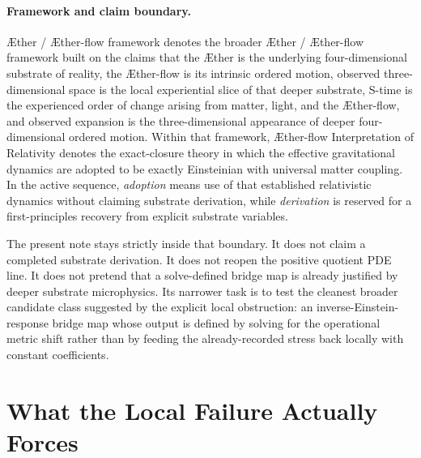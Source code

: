 \documentclass[11pt]{article}
\newcommand{\Aether}{\AE{}ther}
\newcommand{\Aflow}{\AE{}ther-flow}
\newcommand{\TheoryName}{\Aflow{} Interpretation of Relativity}
\newcommand{\TheoryProgram}{\Aether{} / \Aflow{} framework}
\begin{document}
\paragraph{Framework and claim boundary.}
\TheoryProgram{} denotes the broader \Aether{} / \Aflow{} framework built on the claims that the \Aether{} is the underlying four-dimensional substrate of reality, the \Aflow{} is its intrinsic ordered motion, observed three-dimensional space is the local experiential slice of that deeper substrate, S-time is the experienced order of change arising from matter, light, and the \Aflow{}, and observed expansion is the three-dimensional appearance of deeper four-dimensional ordered motion. Within that framework, \TheoryName{} denotes the exact-closure theory in which the effective gravitational dynamics are adopted to be exactly Einsteinian with universal matter coupling. In the active sequence, \emph{adoption} means use of that established relativistic dynamics without claiming substrate derivation, while \emph{derivation} is reserved for a first-principles recovery from explicit substrate variables.

The present note stays strictly inside that boundary. It does not claim a completed substrate derivation. It does not reopen the positive quotient PDE line. It does not pretend that a solve-defined bridge map is already justified by deeper substrate microphysics. Its narrower task is to test the cleanest broader candidate class suggested by the explicit local obstruction: an inverse-Einstein-response bridge map whose output is defined by solving for the operational metric shift rather than by feeding the already-recorded stress back locally with constant coefficients.

\section{What the Local Failure Actually Forces}
\end{document}
